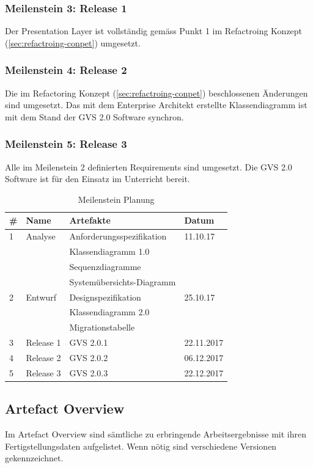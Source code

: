 \documentclass[11pt,a4paper,english,oneside]{book}
\numberwithin{equation}{chapter}
\begin{document}
	\subsubsection{Meilenstein 3: Release 1}
	Der Presentation Layer ist vollständig gemäss Punkt 1 im Refactroing Konzept (\ref{sec:refactroing-conpet}) umgesetzt.
	
	\subsubsection{Meilenstein 4: Release 2}
	Die im Refactoring Konzept (\ref{sec:refactroing-conpet}) beschlossenen Änderungen sind umgesetzt. Das mit dem Enterprise Architekt erstellte Klassendiagramm ist mit dem Stand der GVS 2.0 Software synchron.
	
	\subsubsection{Meilenstein 5: Release 3}
	Alle im Meilenstein 2 definierten Requirements sind umgesetzt. Die GVS 2.0 Software ist für den Einsatz im Unterricht bereit.
	
	\begin{table}[h!]
		\centering
		\begin{tabular}{l l l l}
			\toprule 
			\# & Name & Artefakte & Datum \\
			\toprule 
			1 & Analyse & Anforderungsspezifikation & 11.10.17 \\
			& & Klassendiagramm 1.0 & \\
			& & Sequenzdiagramme & \\
			& &  Systemübersichts-Diagramm & \\
			\midrule
			2 & Entwurf  & Designspezifikation & 25.10.17\\
			& & Klassendiagramm 2.0 & \\
			& & Migrationstabelle & \\
			\midrule
			3 & Release 1 & GVS 2.0.1 & 22.11.2017 \\
			\midrule
			4 & Release 2 & GVS 2.0.2 & 06.12.2017 \\
			\midrule
			5 & Release 3 & GVS 2.0.3 & 22.12.2017 \\
			\bottomrule 
		\end{tabular} 
		\caption{Meilenstein Planung} 
	\end{table}
	
	\subsection{Artefact Overview}
	Im Artefact Overview sind sämtliche zu erbringende Arbeitsergebnisse mit ihren Fertigstellungsdaten aufgelistet. Wenn nötig sind verschiedene Versionen gekennzeichnet.
	
	
\end{document}
